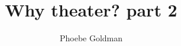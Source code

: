 \title{Why theater? part 2}
\author{Phoebe Goldman}
\date{} %

\newcommand{\theprof}{Profs. Andy Goldberg and Brandon Woolf}
\newcommand{\theclass}{Contemporary German Theater and Performance}

